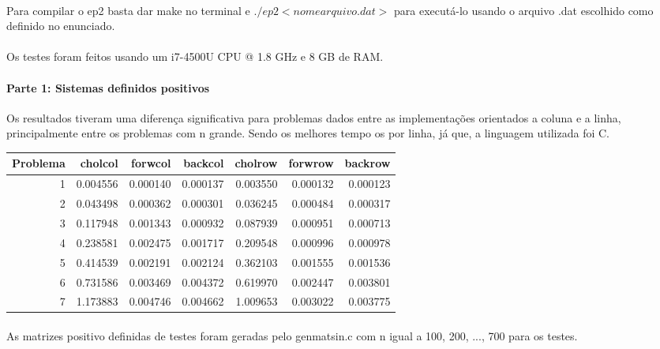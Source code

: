 \documentclass{article}
\begin{document}
	\paragraph{}Para compilar o ep2 basta dar make no terminal e $./ep2 <nome arquivo.dat>$ para executá-lo usando o arquivo .dat escolhido como definido no enunciado.
	\paragraph{}Os testes foram feitos usando um i7-4500U CPU @ 1.8 GHz e 8 GB de RAM.
	\paragraph{Parte 1: Sistemas definidos positivos} Os resultados tiveram uma diferença significativa para problemas dados entre as implementações orientados a coluna e a linha, principalmente entre os problemas com n grande. Sendo os melhores tempo os por linha, já que, a linguagem utilizada foi C.
	\begin{table}[h]
		\centering
		\vspace{0.1cm}
	\begin{tabular}{r|r|r|r|r|r|r}
		Problema & cholcol & forwcol & backcol & cholrow & forwrow & backrow\\
		\hline
		1 & 0.004556 & 0.000140 & 0.000137 & 0.003550 & 0.000132 & 0.000123 \\
		2 & 0.043498 & 0.000362 & 0.000301 & 0.036245 & 0.000484 & 0.000317 \\
		3 & 0.117948 & 0.001343 & 0.000932 & 0.087939 & 0.000951 & 0.000713 \\
		4 & 0.238581 & 0.002475 & 0.001717 & 0.209548 & 0.000996 & 0.000978 \\
		5 & 0.414539 & 0.002191 & 0.002124 & 0.362103 & 0.001555 & 0.001536 \\
		6 & 0.731586 & 0.003469 & 0.004372 & 0.619970 & 0.002447 & 0.003801 \\
		7 & 1.173883 & 0.004746 & 0.004662 & 1.009653 & 0.003022 & 0.003775
	\end{tabular}
	\end{table}
	
	\paragraph{} As matrizes positivo definidas de testes foram geradas pelo genmatsin.c com n igual a 100, 200, ..., 700 para os testes.

	
\end{document}
